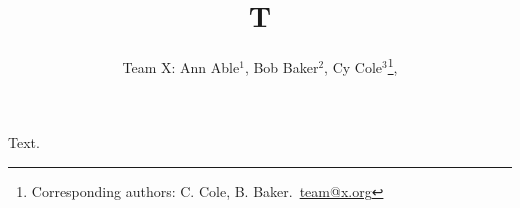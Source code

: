 \documentclass{mnras}
\title{T}
\author[A. Able et al.]{\parbox{\textwidth}{\Large{Team X: Ann Able$^{1}$,
Bob Baker$^{2}${\color{blue}\footnotemark[1]},
Cy Cole$^{3}$\thanks{Corresponding authors: C. Cole, B. Baker.~\href{mailto:team@x.org}{team@x.org}},
}}}
\begin{document}
\maketitle
Text.
\end{document}
